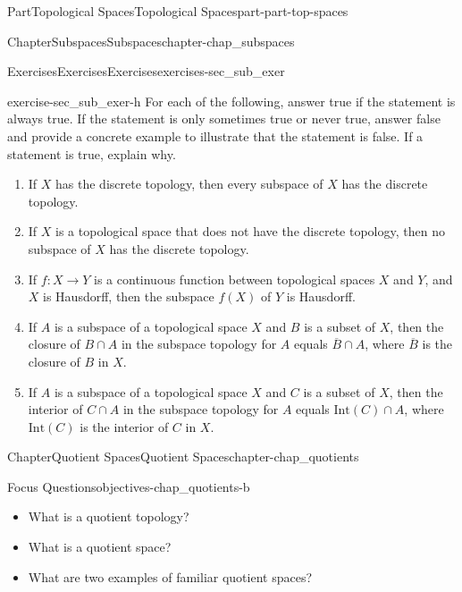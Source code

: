 \documentclass[oneside,10pt,]{book}
\numberwithin{equation}{chapter}
\newcommand{\Int}{\text{Int}}
\begin{document}
\begin{partptx}{Part}{Topological Spaces}{}{Topological Spaces}{}{}{part-part-top-spaces}
\begin{chapterptx}{Chapter}{Subspaces}{}{Subspaces}{}{}{chapter-chap_subspaces}
\begin{exercises-section}{Exercises}{Exercises}{}{Exercises}{}{}{exercises-sec_sub_exer}
\begin{divisionexercise}{8}{}{}{exercise-sec_sub_exer-h}
For each of the following, answer true if the statement is always true. If the statement is only sometimes true or never true, answer false and provide a concrete example to illustrate that the statement is false. If a statement is true, explain why.%
\begin{enumerate}[font=\bfseries,label=(\alph*),ref=\alph*]%
\item{}If \(X\) has the discrete topology, then every subspace of \(X\) has the discrete topology.%
\item{}If \(X\) is a topological space that does not have the discrete topology, then no subspace of \(X\) has the discrete topology.%
\item{}If \(f : X \to Y\) is a continuous function between topological spaces \(X\) and \(Y\), and \(X\) is Hausdorff, then the subspace \(f(X)\) of \(Y\) is Hausdorff.%
\item{}If \(A\) is a subspace of a topological space \(X\) and \(B\) is a subset of \(X\), then the closure of \(B \cap A\) in the subspace topology for \(A\) equals \(\overline{B} \cap A\), where \(\overline{B}\) is the closure of \(B\) in \(X\).%
\item{}If \(A\) is a subspace of a topological space \(X\) and \(C\) is a subset of \(X\), then the interior of \(C \cap A\) in the subspace topology for \(A\) equals \(\Int(C) \cap A\), where \(\Int(C)\) is the interior of \(C\) in \(X\).%
\end{enumerate}%
\end{divisionexercise}%
\end{exercises-section}
\end{chapterptx}
%
\typeout{************************************************}
\typeout{************************************************}
%
\begin{chapterptx}{Chapter}{Quotient Spaces}{}{Quotient Spaces}{}{}{chapter-chap_quotients}
\renewcommand*{\chaptername}{Chapter}
\begin{objectives}{Focus Questions}{objectives-chap_quotients-b}
%
\begin{itemize}[label=\textbullet]
\item{}What is a quotient topology?%
\item{}What is a quotient space?%
\item{}What are two examples of familiar quotient spaces?%
\end{itemize}
\end{objectives}
%
%
\typeout{************************************************}

\end{chapterptx}
\end{partptx}
\end{document}
